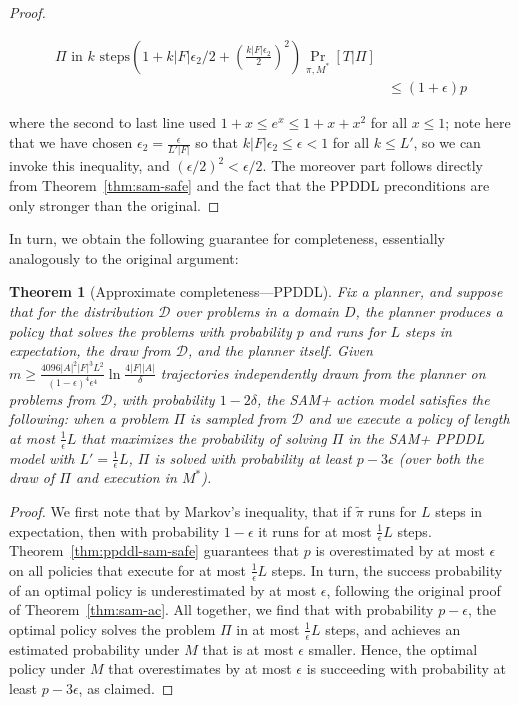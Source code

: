 \documentclass[letterpaper]{article} %
\newtheorem{theorem}{Theorem}
\begin{document}
\begin{proof}
\begin{small}
\begin{align*}
{{\Pi\text{ in }k\text{ steps}}}(1+k|F|\epsilon_2/2+\left(\frac{k|F|\epsilon_2}{2}\right)^2)\Pr_{\pi,M^*}[T|\Pi]\\
&\leq (1+\epsilon)p
\end{align*}
\end{small}
where the second to last line used
$
1+x\leq e^x\leq 1+x+x^2
$
for all $x\leq 1$; note here that we have chosen $\epsilon_2=\frac{\epsilon}{L'|F|}$ so that $k|F|\epsilon_2\leq \epsilon < 1$ for all $k\leq L'$, so we can invoke this inequality, and $(\epsilon/2)^2<\epsilon/2$. The moreover part follows directly from Theorem~\ref{thm:sam-safe} and the fact that the PPDDL preconditions are only stronger than the original.
\end{proof}

In turn, we obtain the following guarantee for completeness, essentially analogously to the original argument:
\begin{theorem}[Approximate completeness---PPDDL]
\label{thm:ppddl-sam-ac}
Fix a planner, and suppose that for the distribution $\mathcal{D}$ over problems in a domain $D$, the planner produces a policy that solves the problems with probability $p$ and runs for $L$ steps in expectation, the draw from $\mathcal{D}$, and the planner itself.
Given 
$
m\geq \frac{4096|A|^2|F|^3L^2}{(1-\epsilon)^4\epsilon^4}\ln\frac{4|F||A|}{\delta}
$
trajectories independently drawn from the planner on problems from $\mathcal{D}$, with probability $1-2\delta$, the SAM+ action model satisfies the following:  when a problem $\Pi$ is sampled from $\mathcal{D}$ and we execute a policy of length at most $\frac{1}{\epsilon}L$ that maximizes the probability of solving $\Pi$ in the SAM+ PPDDL model with $L'=\frac{1}{\epsilon}L$, $\Pi$ is solved with probability at least $p-3\epsilon$ (over both the draw of $\Pi$ and execution in $M^*$).
\end{theorem}
\begin{proof}
We first note that by Markov's inequality, that if $\tilde{\pi}$ runs for $L$ steps in expectation, then with probability $1-\epsilon$ it runs for at most $\frac{1}{\epsilon}L$ steps. Theorem~\ref{thm:ppddl-sam-safe} guarantees that $p$ is overestimated by at most $\epsilon$ on all policies that execute for at most $\frac{1}{\epsilon}L$ steps. In turn, the success probability of an optimal policy is underestimated by at most $\epsilon$, following the original proof of Theorem~\ref{thm:sam-ac}. All together, we find that with probability $p-\epsilon$, the optimal policy solves the problem $\Pi$ in at most $\frac{1}{\epsilon}L$ steps, and achieves an estimated probability under $M$ that is at most $\epsilon$ smaller. Hence, the optimal policy under $M$ that overestimates by at most $\epsilon$ is succeeding with probability at least $p-3\epsilon$, as claimed. 
\end{proof}
\end{document}
